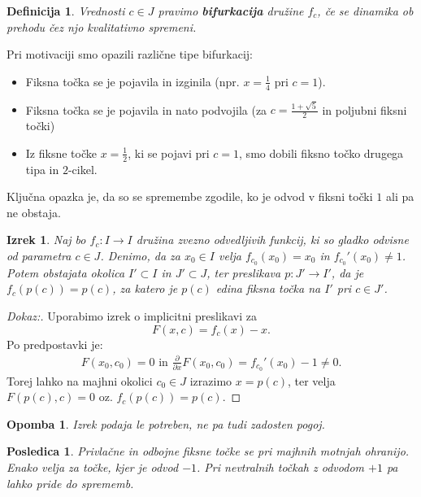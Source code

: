 \documentclass{article}
\newtheorem{definicija}{Definicija}
\newtheorem{posledica}{Posledica}
\newtheorem{opomba}{Opomba}
\newtheorem{izrek}{Izrek}
\begin{document}
\begin{definicija}
Vrednosti $c\in J$ pravimo \textbf{bifurkacija} družine $f_c$, če se dinamika 
ob prehodu čez njo kvalitativno spremeni.
\end{definicija}

Pri motivaciji smo opazili različne tipe bifurkacij:
\begin{itemize}
\item Fiksna točka se je pojavila in izginila (npr. $x = \frac{1}{4}$ pri $c=1$).
\item Fiksna točka se je pojavila in nato podvojila (za $c = \frac{1 + \sqrt{5}}{2}$ in poljubni fiksni točki)
\item Iz fiksne točke $x = \frac{1}{2}$, ki se pojavi pri $c = 1$, smo dobili fiksno točko drugega tipa in $2$-cikel.
\end{itemize}
Ključna opazka je, da so se spremembe zgodile, ko je odvod v fiksni točki $1$ ali pa ne obstaja.

\begin{izrek}
Naj bo $f_c: I \rightarrow I$ družina zvezno odvedljivih funkcij, ki so gladko odvisne od parametra $c\in J$. Denimo, da za $x_0 \in I$ velja $f_{c_0}(x_0) = x_0$ in $f_{c_0}'(x_0) \neq 1$. Potem obstajata okolica $I' \subset I$ in $J' \subset J$, ter preslikava $p: J' \rightarrow I'$, da je $f_c(p(c)) = p(c)$, za katero je $p(c)$ edina fiksna točka na $I'$ pri $c\in J'$. 
\end{izrek}

\begin{proof}[Dokaz:]
Uporabimo izrek o implicitni preslikavi za 
$$
F(x, c) = f_c(x) - x.
$$
Po predpostavki je:
\begin{align*}
F(x_0, c_0) = 0 \text{ in } \frac{\partial}{\partial x} F(x_0, c_0) = f_{c_0}'(x_0) - 1 \neq 0. 
\end{align*}
Torej lahko na majhni okolici $c_0 \in J$ izrazimo $x = p(c)$, ter velja $F(p(c), c) = 0$ oz. $f_c(p(c)) = p(c)$.
\end{proof}

\begin{opomba}
Izrek podaja le potreben, ne pa tudi zadosten pogoj.
\end{opomba}

\begin{posledica}
Privlačne in odbojne fiksne točke se pri majhnih motnjah ohranijo. Enako velja 
za točke, kjer je odvod $-1$. Pri nevtralnih točkah z odvodom $+1$ pa lahko pride 
do sprememb.
\end{posledica}
\end{document}
